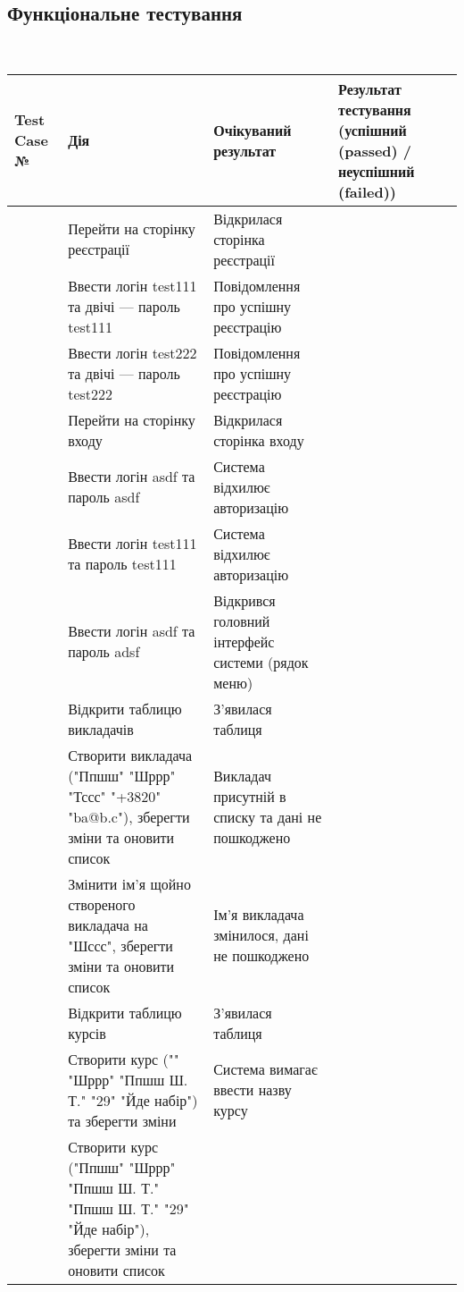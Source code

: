 \subsection{Функціональне тестування}
\\
\def\tcn{\addtocounter{tcnt}{1} \thetcnt}
\tablefirsthead{}
\tablelasttail{}
\tabletail{\hline}
\begin{supertabular}{|p{13mm}|p{65mm}|p{45mm}|p{3cm}|}
\hline
\textbf{Test Case №} &
\textbf{Дія} &
\textbf{Очікуваний результат} &
\textbf{Результат тестування (успішний (passed) / неуспішний (failed))} \\
\hline \tcn
& Перейти на сторінку реєстрації
& Відкрилася сторінка реєстрації
& 
\\ \hline \tcn
& Ввести логін test111 та двічі --- пароль test111
& Повідомлення про успішну реєстрацію
& 
\\ \hline \tcn
& Ввести логін test222 та двічі --- пароль test222
& Повідомлення про успішну реєстрацію
& 
\\ \hline \tcn
& Перейти на сторінку входу
& Відкрилася сторінка входу
& 
\\ \hline \tcn
& Ввести логін asdf та пароль asdf
& Система відхилює авторизацію
& 
\\ \hline \tcn
& Ввести логін test111 та пароль test111
& Система відхилює авторизацію
& 
\\ \hline \tcn
& Ввести логін asdf та пароль adsf
& Відкрився головний інтерфейс системи (рядок меню)
& 
\\ \hline \tcn
& Відкрити таблицю викладачів
& З'явилася таблиця
& 
\\ \hline \tcn
& Створити викладача ("Ппшш" "Шррр" "Тссс" "+3820" "ba@b.c"), зберегти зміни та оновити список
& Викладач присутній в списку та дані не пошкоджено
& 
\\ \hline \tcn
& Змінити ім'я щойно створеного викладача на "Шссс", зберегти зміни та оновити список
& Ім'я викладача змінилося, дані не пошкоджено
& 
\\ \hline \tcn
& Відкрити таблицю курсів
& З'явилася таблиця
& 
\\ \hline \tcn
& Створити курс ("" "Шррр" "Ппшш Ш. Т." "29" "Йде набір") та зберегти зміни
& Система вимагає ввести назву курсу
& 
\\ \hline \tcn
& Створити курс ("Ппшш" "Шррр" "Ппшш Ш. Т." "Ппшш Ш. Т." "29" "Йде набір"), зберегти зміни та оновити список

\end{supertabular}
